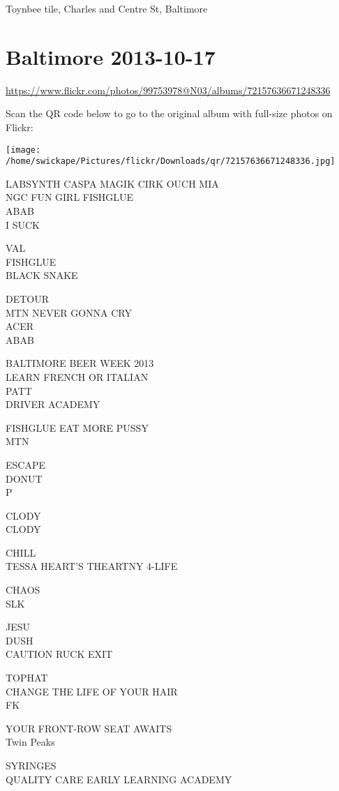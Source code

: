 \documentclass[10pt,letterpaper]{article}
\begin{document}
Toynbee tile, Charles and Centre St, Baltimore
\pagebreak

\section*{Baltimore 2013-10-17}

\url{https://www.flickr.com/photos/99753978@N03/albums/72157636671248336}

Scan the QR code below to go to the original album with full-size photos on Flickr:

\texttt{[image: /home/swickape/Pictures/flickr/Downloads/qr/72157636671248336.jpg]}
\pagebreak

LABSYNTH CASPA MAGIK CIRK OUCH MIA\\
NGC FUN GIRL FISHGLUE\\
ABAB\\
I SUCK

VAL\\
FISHGLUE\\
BLACK SNAKE

DETOUR\\
MTN NEVER GONNA CRY\\
ACER\\
ABAB

BALTIMORE BEER WEEK 2013\\
LEARN FRENCH OR ITALIAN\\
PATT\\
DRIVER ACADEMY

FISHGLUE EAT MORE PUSSY\\
MTN

ESCAPE\\
DONUT\\
P

CLODY\\
CLODY

CHILL\\
TESSA HEART'S THEARTNY 4{-}LIFE

CHAOS\\
SLK

JESU\\
DUSH\\
CAUTION RUCK EXIT

TOPHAT\\
CHANGE THE LIFE OF YOUR HAIR\\
FK

YOUR FRONT{-}ROW SEAT AWAITS\\
Twin Peaks

SYRINGES\\
QUALITY CARE EARLY LEARNING ACADEMY
\end{document}
